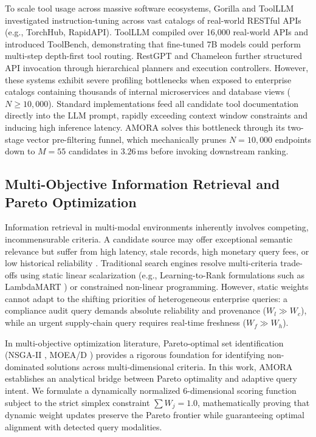 \documentclass[fleqn,10pt]{article}
\begin{document}
To scale tool usage across massive software ecosystems, Gorilla \cite{patil2023gorilla} and ToolLLM \cite{qin2023toolllm} investigated instruction-tuning across vast catalogs of real-world RESTful APIs (e.g., TorchHub, RapidAPI). ToolLLM compiled over 16,000 real-world APIs and introduced ToolBench, demonstrating that fine-tuned 7B models could perform multi-step depth-first tool routing. RestGPT \cite{song2023restgpt} and Chameleon \cite{lu2023chameleon} further structured API invocation through hierarchical planners and execution controllers. However, these systems exhibit severe profiling bottlenecks when exposed to enterprise catalogs containing thousands of internal microservices and database views ($N \ge 10{,}000$). Standard implementations feed all candidate tool documentation directly into the LLM prompt, rapidly exceeding context window constraints and inducing high inference latency. AMORA solves this bottleneck through its two-stage vector pre-filtering funnel, which mechanically prunes $N=10{,}000$ endpoints down to $M=55$ candidates in $3.26\,\text{ms}$ before invoking downstream ranking.

\subsection{Multi-Objective Information Retrieval and Pareto Optimization}
Information retrieval in multi-modal environments inherently involves competing, incommensurable criteria. A candidate source may offer exceptional semantic relevance but suffer from high latency, stale records, high monetary query fees, or low historical reliability \cite{miettinen1999multiobjective,deb2001multi}. Traditional search engines resolve multi-criteria trade-offs using static linear scalarization (e.g., Learning-to-Rank formulations such as LambdaMART \cite{burges2010lambdamart}) or constrained non-linear programming. However, static weights cannot adapt to the shifting priorities of heterogeneous enterprise queries: a compliance audit query demands absolute reliability and provenance ($W_l \gg W_c$), while an urgent supply-chain query requires real-time freshness ($W_f \gg W_h$).

In multi-objective optimization literature, Pareto-optimal set identification (NSGA-II \cite{deb2002fast}, MOEA/D \cite{zhang2007moea}) provides a rigorous foundation for identifying non-dominated solutions across multi-dimensional criteria. In this work, AMORA establishes an analytical bridge between Pareto optimality and adaptive query intent. We formulate a dynamically normalized 6-dimensional scoring function subject to the strict simplex constraint $\sum W_j = 1.0$, mathematically proving that dynamic weight updates preserve the Pareto frontier while guaranteeing optimal alignment with detected query modalities.
\end{document}
